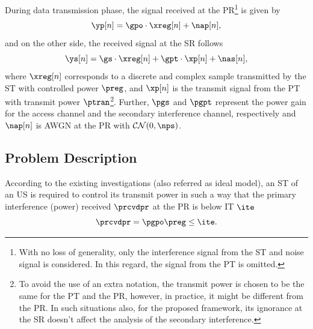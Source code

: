 During data transmission phase, the signal received at the PR\footnote{With no loss of generality, only the interference signal from the ST and noise signal is considered. In this regard, the signal from the PT is omitted.} is given by
\begin{equation}
\yp[n] = \gpo  \cdot \xreg[n] + \nap[n],
\label{eq:sys_mod_pr}
\end{equation}
and on the other side, the received signal at the SR follows 
\begin{equation}
\ys[n] = \gs \cdot \xreg[n] + \gpt \cdot \xp[n] + \nas[n],
\label{eq:sys_mod_sr}
\end{equation}
where $\xreg[n]$ corresponds to a discrete and complex sample transmitted by the ST with controlled power $\preg$, and $\xp[n]$ is the transmit signal from the PT with transmit power $\ptran$\footnote{To avoid the use of an extra notation, the transmit power is chosen to be the same for the PT and the PR, however, in practice, it might be different from the PR. In such situations also, for the proposed framework, its ignorance at the SR doesn't affect the analysis of the secondary interference.}. Further, $\pgs$ and $\pgpt$ represent the power gain for the access channel and the secondary interference channel, respectively and $\nap[n]$ is AWGN at the PR with $\mathcal{CN}(0, \nps)$. %


\subsection{Problem Description} \label{ssec:pd}
According to the existing investigations (also referred as ideal model), an ST of an US is required to control its transmit power in such a way that the primary interference (power) received $\prcvdpr$ at the PR is below IT $\ite$ \cite{Xing07}
\begin{equation}
\prcvdpr = \pgpo \preg \le \ite.
\label{eq:IT_id}
\end{equation}

